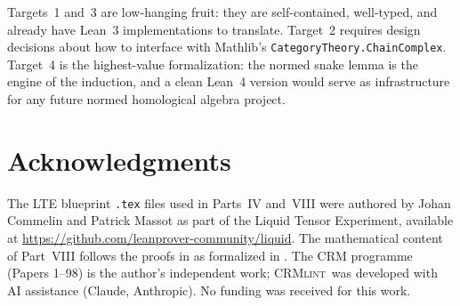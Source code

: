 \documentclass[11pt,a4paper]{article}
\theoremstyle{plain}
\theoremstyle{definition}
\newcommand{\CRMlint}{\textsc{CRMlint}}
\begin{document}
Targets~1 and~3 are low-hanging fruit: they are self-contained,
well-typed, and already have Lean~3 implementations to translate.
Target~2 requires design decisions about how to interface
with Mathlib's \texttt{CategoryTheory.ChainComplex}.
Target~4 is the highest-value formalization: the normed snake
lemma is the engine of the induction, and a clean Lean~4
version would serve as infrastructure for any future normed
homological algebra project.



\section*{Acknowledgments}

The LTE blueprint \texttt{.tex} files used in Parts~IV and~VIII were
authored by Johan Commelin and Patrick Massot as part of the Liquid
Tensor Experiment, available at
\url{https://github.com/leanprover-community/liquid}.
The mathematical content of Part~VIII follows the proofs in
\cite{Scholze2019} as formalized in \cite{Commelin2022}.
The CRM programme (Papers 1--98) is the author's independent work;
\CRMlint\ was developed with AI assistance (Claude, Anthropic).
No funding was received for this work.
\end{document}
